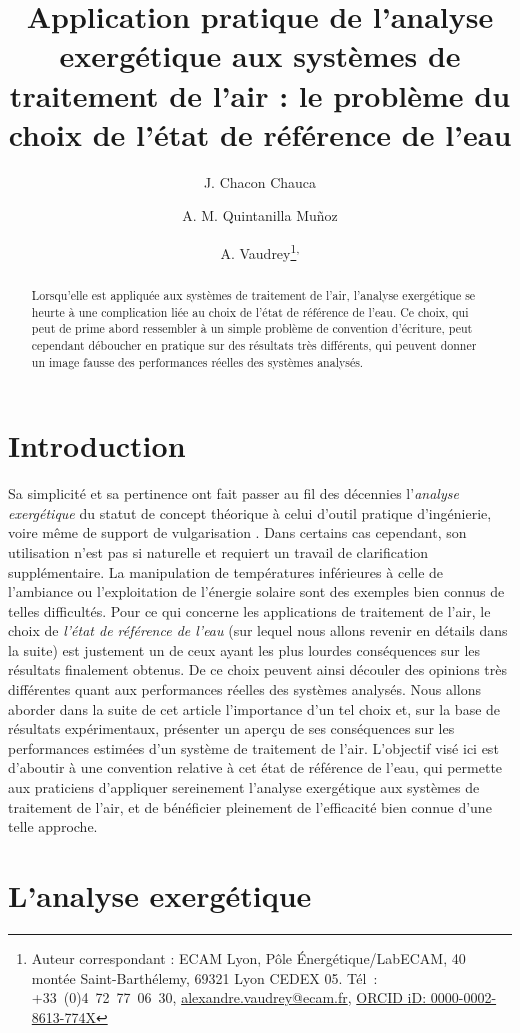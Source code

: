 \documentclass[a4paper,11pt]{scrartcl}
\title{Application pratique de l'analyse exergétique aux systèmes de traitement de l'air : le problème du choix de l'état de référence de l'eau}
\author[1,2]{J. Chacon Chauca}
\author[3]{A. M. Quintanilla Muñoz}
\author[2]{A. Vaudrey\thanks{Auteur correspondant : ECAM Lyon, Pôle Énergétique/LabECAM, 40 montée Saint-Barthélemy, 69321 Lyon CEDEX 05. Tél : +33 (0)4 72 77 06 30, \href{mailto:alexandre.vaudrey@ecam.fr}{alexandre.vaudrey@ecam.fr}, \href{http://orcid.org/0000-0002-8613-774X}{ORCID iD: 0000-0002-8613-774X}}\textsuperscript{,}}
\affil[1]{Université de Lyon, ECAM Lyon, INSA-Lyon, LabECAM, F-69005, France.}
\affil[2]{Pontificia Universidad Cat\'olica del Per\'u (PUCP), Laboratorio
de Energ\'ia, Lima, Per\'u.}
\affil[3]{Département Énergie, Institut FEMTO-ST, UMR 6174, CNRS, Université de Bourgogne Franche-Comté, Belfort, France.}
\begin{document}
\maketitle

\begin{abstract}
Lorsqu'elle est appliquée aux systèmes de traitement de l'air, l'analyse exergétique se heurte à une complication liée au choix de l'état de référence de l'eau. Ce choix, qui peut de prime abord ressembler à un simple problème de convention d'écriture, peut cependant déboucher en pratique sur des résultats très différents, qui peuvent donner un image fausse des performances réelles des systèmes analysés. 
\end{abstract}

\section{Introduction}

Sa simplicité et sa pertinence ont fait passer au fil des décennies l'\emph{analyse exergétique} du statut de concept théorique à celui d'outil pratique d'ingénierie, voire même de support de vulgarisation \cite{SV-2013}. Dans certains cas cependant, son utilisation n’est pas si naturelle et requiert un travail de clarification supplémentaire. La manipulation de températures inférieures à celle de l’ambiance \cite{RGT-035-0651} ou l’exploitation de l’énergie solaire \cite{EPL-104-40008} sont des exemples bien connus de telles difficultés. Pour ce qui concerne les applications de traitement de l’air, le choix de \emph{l’état de référence de l’eau} (sur lequel nous allons revenir en détails dans la suite) est justement un de ceux ayant les plus lourdes conséquences sur les résultats finalement obtenus. De ce choix peuvent ainsi découler des opinions très différentes quant aux performances réelles des systèmes analysés. Nous allons aborder dans la suite de cet article l’importance d’un tel choix et, sur la base de résultats expérimentaux, présenter un aperçu de ses conséquences sur les performances estimées d’un système de traitement de l’air. L’objectif visé ici est d’aboutir à une convention relative à cet état de référence de l’eau, qui permette aux praticiens d’appliquer sereinement l’analyse exergétique aux systèmes de traitement de l’air, et de bénéficier pleinement de l’efficacité bien connue d’une telle approche.

\section{L'analyse exergétique}
\end{document}
